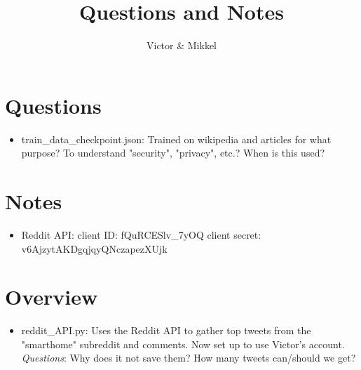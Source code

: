 \documentclass{article}
\begin{document}
\title{Questions and Notes}
\author{Victor \& Mikkel}

\maketitle

\section{Questions}
\begin{itemize}
	\item train\_data\_checkpoint.json:
	Trained on wikipedia and articles for what purpose?
	To understand "security", "privacy", etc.?
	When is this used?

\end{itemize}

\section{Notes}
\begin{itemize}
	\item Reddit API:
	client ID: fQuRCESlv\_7yOQ
	client secret: v6AjzytAKDgqjqyQNczapezXUjk
\end{itemize}

\section{Overview}
\begin{itemize}
	\item reddit\_API.py:
	Uses the Reddit API to gather top tweets
	from the "smarthome" subreddit and comments.
	Now set up to use Victor's account.
	\emph{Questions}: Why does it not save them?
	How many tweets can/should we get?
\end{itemize}
\end{document}
